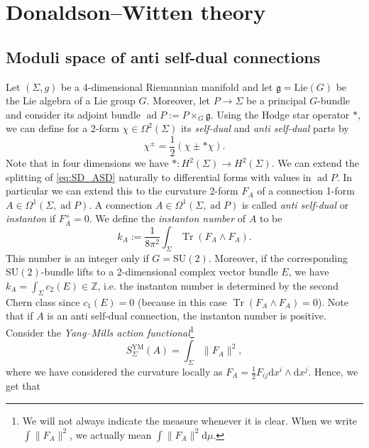 \documentclass[11pt,colorinlistoftodos]{amsart}
\numberwithin{equation}{subsection}
\theoremstyle{plain}
\theoremstyle{definition}
\theoremstyle{remark}
\newcommand{\Z}{\mathbb{Z}}
\newcommand{\dd}{{\mathrm{d}}}
\DeclareMathOperator{\tr}{Tr}
\DeclareMathOperator{\ad}{ad}
\begin{document}
\section{Donaldson--Witten theory}
\label{sec:Donaldson-Witten_theory}
\subsection{Moduli space of anti self-dual connections}
\label{subsec:Moduli_space_of_anti_self-dual_connections}
Let $(\Sigma,g)$ be a 4-dimensional Riemannian manifold and let $\mathfrak{g}=\mathrm{Lie}(G)$ be the Lie algebra of a Lie group $G$. Moreover, let $P\to \Sigma$ be a principal $G$-bundle and consider its adjoint bundle $\ad P:=P\times_G\mathfrak{g}$.
Using the Hodge star operator $*$, we can define for a 2-form $\chi\in \Omega^2(\Sigma)$ its \emph{self-dual} and \emph{anti self-dual} parts by
\begin{equation}
\label{eq:SD_ASD}
    \chi^\pm=\frac{1}{2}(\chi\pm *\chi).
\end{equation}
Note that in four dimensions we have $*\colon H^2(\Sigma)\to H^2(\Sigma)$. We can extend the splitting of \eqref{eq:SD_ASD} naturally to differential forms with values in $\ad P$. In particular we can extend this to the curvature 2-form $F_A$ of a connection 1-form $A\in \Omega^1(\Sigma,\ad P)$. A connection $A\in \Omega^1(\Sigma,\ad P)$ is called \emph{anti self-dual} or \emph{instanton} if $F^+_A=0$. We define the \emph{instanton number} of $A$ to be 
\begin{equation}
\label{eq:instanton_number}
    k_A:=\frac{1}{8\pi^2}\int_\Sigma\tr(F_A\land F_A).
\end{equation}
This number is an integer only if $G=\mathrm{SU}(2)$. Moreover, if the corresponding $\mathrm{SU}(2)$-bundle lifts to a 2-dimensional complex vector bundle $E$, we have $k_A=\int_\Sigma c_2(E)\in\Z$, i.e. the instanton number is determined by the second Chern class since $c_1(E)=0$ (because in this case $\tr(F_A\land F_A)=0$). Note that if $A$ is an anti self-dual connection, the instanton number is positive. Consider the \emph{Yang--Mills action functional}\footnote{We will not always indicate the measure whenever it is clear. When we write $\int \|F_A\|^2$, we actually mean $\int \|F_A\|^2\dd\mu$.} 
\begin{equation}
    S^{\mathrm{YM}}_\Sigma(A)=\int_\Sigma\|F_A\|^2,
\end{equation}
where we have considered the curvature locally as $F_A=\frac{1}{2}F_{ij}\dd x^i\land \dd x^j$. Hence, we get that
\end{document}
